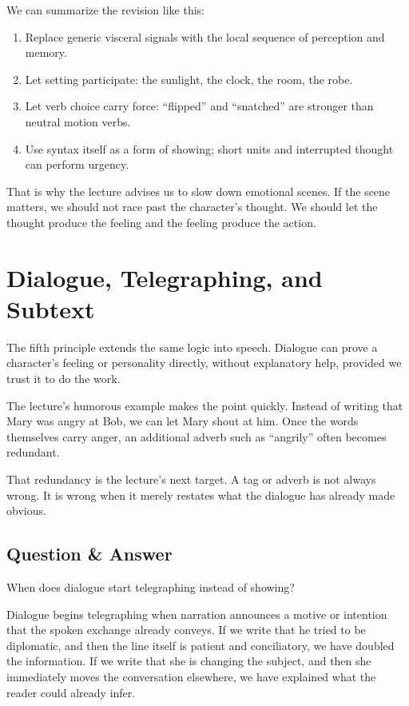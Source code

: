 We can summarize the revision like this:

\begin{enumerate}
\item Replace generic visceral signals with the local sequence of perception and memory.
\item Let setting participate: the sunlight, the clock, the room, the robe.
\item Let verb choice carry force: ``flipped'' and ``snatched'' are stronger than neutral motion verbs.
\item Use syntax itself as a form of showing; short units and interrupted thought can perform urgency.
\end{enumerate}

That is why the lecture advises us to slow down emotional scenes. If the scene matters, we should not race past the character's thought. We should let the thought produce the feeling and the feeling produce the action.

\section{Dialogue, Telegraphing, and Subtext}

The fifth principle extends the same logic into speech. Dialogue can prove a character's feeling or personality directly, without explanatory help, provided we trust it to do the work.

The lecture's humorous example makes the point quickly. Instead of writing that Mary was angry at Bob, we can let Mary shout at him. Once the words themselves carry anger, an additional adverb such as ``angrily'' often becomes redundant.

That redundancy is the lecture's next target. A tag or adverb is not always wrong. It is wrong when it merely restates what the dialogue has already made obvious.

\subsection{Question \& Answer}

When does dialogue start telegraphing instead of showing?

Dialogue begins telegraphing when narration announces a motive or intention that the spoken exchange already conveys. If we write that he tried to be diplomatic, and then the line itself is patient and conciliatory, we have doubled the information. If we write that she is changing the subject, and then she immediately moves the conversation elsewhere, we have explained what the reader could already infer.

